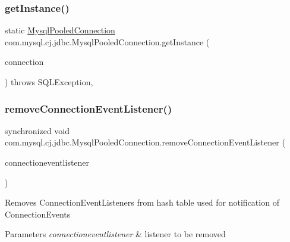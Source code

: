 \subsubsection{\texorpdfstring{get\+Instance()}{getInstance()}}
{\footnotesize\ttfamily static \mbox{\hyperlink{classcom_1_1mysql_1_1cj_1_1jdbc_1_1_mysql_pooled_connection}{Mysql\+Pooled\+Connection}} com.\+mysql.\+cj.\+jdbc.\+Mysql\+Pooled\+Connection.\+get\+Instance (\begin{DoxyParamCaption}\item[{\mbox{\hyperlink{interfacecom_1_1mysql_1_1cj_1_1jdbc_1_1_jdbc_connection}{com.\+mysql.\+cj.\+jdbc.\+Jdbc\+Connection}}}]{connection }\end{DoxyParamCaption}) throws S\+Q\+L\+Exception\hspace{0.3cm}{\ttfamily [static]}, {\ttfamily [protected]}}

\mbox{\label{classcom_1_1mysql_1_1cj_1_1jdbc_1_1_mysql_pooled_connection_a04e5a3da33510961ae371ab051926e9f}} 
\subsubsection{\texorpdfstring{remove\+Connection\+Event\+Listener()}{removeConnectionEventListener()}}
{\footnotesize\ttfamily synchronized void com.\+mysql.\+cj.\+jdbc.\+Mysql\+Pooled\+Connection.\+remove\+Connection\+Event\+Listener (\begin{DoxyParamCaption}\item[{Connection\+Event\+Listener}]{connectioneventlistener }\end{DoxyParamCaption})}

Removes Connection\+Event\+Listeners from hash table used for notification of Connection\+Events


\begin{DoxyParams}{Parameters}
{\em connectioneventlistener} & listener to be removed \\
\hline
\end{DoxyParams}
\mbox{\label{classcom_1_1mysql_1_1cj_1_1jdbc_1_1_mysql_pooled_connection_a9f58a333cb514007a999c93879dcfe51}} 
